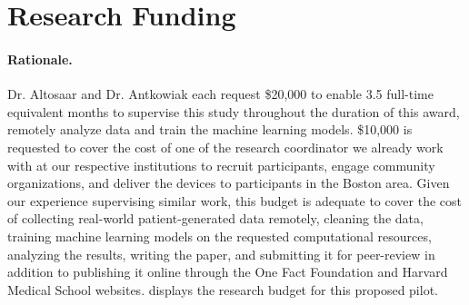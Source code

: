 \documentclass[twoside]{article}
\begin{document}
%
%
\section{Research Funding}
\paragraph{Rationale.} Dr. Altosaar and Dr. Antkowiak each request \$20,000 to enable 3.5 full-time equivalent months to supervise this study throughout the duration of this award, remotely analyze data and train the machine learning models. \$10,000 is requested to cover the cost of one of the research coordinator we already work with at our respective institutions to recruit participants, engage community organizations, and deliver the devices to participants in the Boston area. Given our experience supervising similar work, this budget is adequate to cover the cost of collecting real-world patient-generated data remotely, cleaning the data, training machine learning models on the requested computational resources, analyzing the results, writing the paper, and submitting it for peer-review in addition to publishing it online through the One Fact Foundation and Harvard Medical School websites.  displays the research budget for this proposed pilot.
\end{document}
